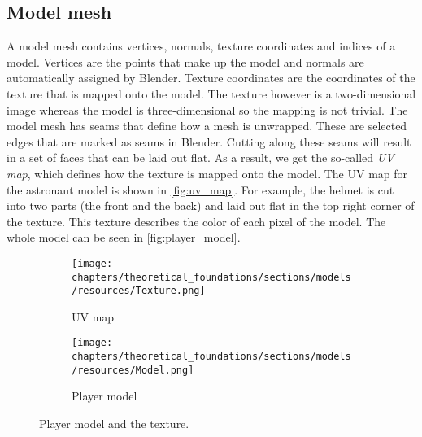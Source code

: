 \subsection{Model mesh} \label{sec:theory_theory_models_mesh}
A model mesh contains vertices, normals, texture coordinates and indices of a model.
Vertices are the points that make up the model and normals are automatically assigned by Blender.
Texture coordinates are the coordinates of the texture that is mapped onto the model.
The texture however is a two-dimensional image whereas the model is three-dimensional so the mapping is not trivial.
The model mesh has seams that define how a mesh is unwrapped.
These are selected edges that are marked as seams in Blender.
Cutting along these seams will result in a set of faces that can be laid out flat.
As a result, we get the so-called \textit{UV map}, which defines how the texture is mapped onto the model.
The UV map for the astronaut model is shown in \autoref{fig:uv_map}.
For example, the helmet is cut into two parts (the front and the back) and laid out flat in the top right corner of the texture.
This texture describes the color of each pixel of the model.
The whole model can be seen in \autoref{fig:player_model}.

\begin{figure}[h]
    \centering
    \begin{subfigure}{0.45\textwidth}
        \centering
        \texttt{[image: chapters/theoretical\_foundations/sections/models/resources/Texture.png]}
        \caption{UV map}
        \label{fig:uv_map}
    \end{subfigure}
    \hfill
    \begin{subfigure}{0.45\textwidth}
        \centering
        \texttt{[image: chapters/theoretical\_foundations/sections/models/resources/Model.png]}
        \caption{Player model}
        \label{fig:player_model}
    \end{subfigure}

    \caption{Player model and the texture.}
\end{figure}
